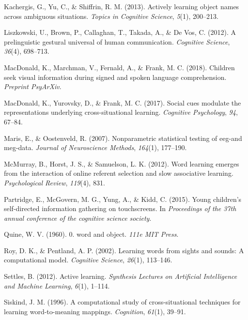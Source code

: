 \documentclass[man,floatsintext]{apa6}
\begin{document}
\hypertarget{ref-kachergis2013actively}{}
Kachergis, G., Yu, C., \& Shiffrin, R. M. (2013). Actively learning
object names across ambiguous situations. \emph{Topics in Cognitive
Science}, \emph{5}(1), 200--213.

\hypertarget{ref-liszkowski2012prelinguistic}{}
Liszkowski, U., Brown, P., Callaghan, T., Takada, A., \& De Vos, C.
(2012). A prelinguistic gestural universal of human communication.
\emph{Cognitive Science}, \emph{36}(4), 698--713.

\hypertarget{ref-macdonald2018speed}{}
MacDonald, K., Marchman, V., Fernald, A., \& Frank, M. C. (2018).
Children seek visual information during signed and spoken language
comprehension. \emph{Preprint PsyArXiv}.

\hypertarget{ref-macdonald2017social}{}
MacDonald, K., Yurovsky, D., \& Frank, M. C. (2017). Social cues
modulate the representations underlying cross-situational learning.
\emph{Cognitive Psychology}, \emph{94}, 67--84.

\hypertarget{ref-maris2007nonparametric}{}
Maris, E., \& Oostenveld, R. (2007). Nonparametric statistical testing
of eeg-and meg-data. \emph{Journal of Neuroscience Methods},
\emph{164}(1), 177--190.

\hypertarget{ref-mcmurray2012word}{}
McMurray, B., Horst, J. S., \& Samuelson, L. K. (2012). Word learning
emerges from the interaction of online referent selection and slow
associative learning. \emph{Psychological Review}, \emph{119}(4), 831.

\hypertarget{ref-partridge2015young}{}
Partridge, E., McGovern, M. G., Yung, A., \& Kidd, C. (2015). Young
children's self-directed information gathering on touchscreens. In
\emph{Proceedings of the 37th annual conference of the cognitive science
society}.

\hypertarget{ref-quine19600}{}
Quine, W. V. (1960). 0. word and object. \emph{111e MIT Press}.

\hypertarget{ref-roy2002learning}{}
Roy, D. K., \& Pentland, A. P. (2002). Learning words from sights and
sounds: A computational model. \emph{Cognitive Science}, \emph{26}(1),
113--146.

\hypertarget{ref-settles2012active}{}
Settles, B. (2012). Active learning. \emph{Synthesis Lectures on
Artificial Intelligence and Machine Learning}, \emph{6}(1), 1--114.

\hypertarget{ref-siskind1996computational}{}
Siskind, J. M. (1996). A computational study of cross-situational
techniques for learning word-to-meaning mappings. \emph{Cognition},
\emph{61}(1), 39--91.
\end{document}
